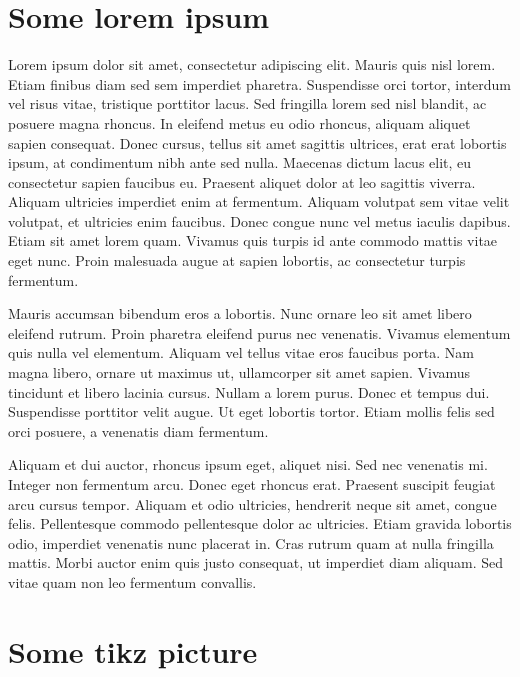 \documentclass[12pt, a4paper]{article}
\begin{document}
\section{Some lorem ipsum}

Lorem ipsum dolor sit amet, consectetur adipiscing elit. Mauris quis nisl lorem. Etiam finibus diam sed sem imperdiet pharetra. Suspendisse orci tortor, interdum vel risus vitae, tristique porttitor lacus. Sed fringilla lorem sed nisl blandit, ac posuere magna rhoncus. In eleifend metus eu odio rhoncus, aliquam aliquet sapien consequat. Donec cursus, tellus sit amet sagittis ultrices, erat erat lobortis ipsum, at condimentum nibh ante sed nulla. Maecenas dictum lacus elit, eu consectetur sapien faucibus eu. Praesent aliquet dolor at leo sagittis viverra. Aliquam ultricies imperdiet enim at fermentum. Aliquam volutpat sem vitae velit volutpat, et ultricies enim faucibus. Donec congue nunc vel metus iaculis dapibus. Etiam sit amet lorem quam. Vivamus quis turpis id ante commodo mattis vitae eget nunc. Proin malesuada augue at sapien lobortis, ac consectetur turpis fermentum.

Mauris accumsan bibendum eros a lobortis. Nunc ornare leo sit amet libero eleifend rutrum. Proin pharetra eleifend purus nec venenatis. Vivamus elementum quis nulla vel elementum. Aliquam vel tellus vitae eros faucibus porta. Nam magna libero, ornare ut maximus ut, ullamcorper sit amet sapien. Vivamus tincidunt et libero lacinia cursus. Nullam a lorem purus. Donec et tempus dui. Suspendisse porttitor velit augue. Ut eget lobortis tortor. Etiam mollis felis sed orci posuere, a venenatis diam fermentum.

Aliquam et dui auctor, rhoncus ipsum eget, aliquet nisi. Sed nec venenatis mi. Integer non fermentum arcu. Donec eget rhoncus erat. Praesent suscipit feugiat arcu cursus tempor. Aliquam et odio ultricies, hendrerit neque sit amet, congue felis. Pellentesque commodo pellentesque dolor ac ultricies. Etiam gravida lobortis odio, imperdiet venenatis nunc placerat in. Cras rutrum quam at nulla fringilla mattis. Morbi auctor enim quis justo consequat, ut imperdiet diam aliquam. Sed vitae quam non leo fermentum convallis.

\section{Some tikz picture}
\end{document}
